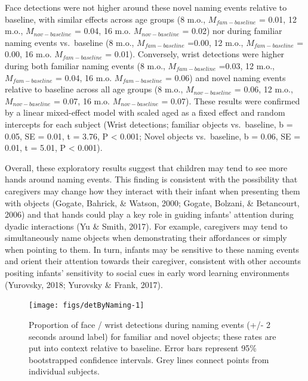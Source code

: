 \documentclass[english,man]{apa6}
\begin{document}
Face detections were not higher around these novel naming events
relative to baseline, with similar effects across age groups (8 m.o.,
\(M_{fam - baseline}\) = 0.01, 12 m.o., \(M_{nov - baseline}\) = 0.04,
16 m.o. \(M_{nov - baseline}\) = 0.02) nor during familiar naming events
vs.~baseline (8 m.o., \(M_{fam - baseline}\) =0.00, 12 m.o.,
\(M_{fam - baseline}\) = 0.00, 16 m.o. \(M_{fam - baseline}\) = 0.01).
Conversely, wrist detections were higher during both familiar naming
events (8 m.o., \(M_{fam - baseline}\) =0.03, 12 m.o.,
\(M_{fam - baseline}\) = 0.04, 16 m.o. \(M_{fam - baseline}\) = 0.06)
and novel naming events relative to baseline across all age groups (8
m.o., \(M_{nov - baseline}\) = 0.06, 12 m.o., \(M_{nov - baseline}\) =
0.07, 16 m.o. \(M_{nov - baseline}\) = 0.07). These results were
confirmed by a linear mixed-effect model with scaled aged as a fixed
effect and random intercepts for each subject (Wrist detections;
familiar objects vs.~baseline, b = 0.05, SE = 0.01, t = 3.76, P
\textless{} 0.001; Novel objects vs.~baseline, b = 0.06, SE = 0.01, t =
5.01, P \textless{} 0.001).

Overall, these exploratory results suggest that children may tend to see
more hands around naming events. This finding is consistent with the
possibility that caregivers may change how they interact with their
infant when presenting them with objects (Gogate, Bahrick, \& Watson,
2000; Gogate, Bolzani, \& Betancourt, 2006) and that hands could play a
key role in guiding infants' attention during dyadic interactions (Yu \&
Smith, 2017). For example, caregivers may tend to simultaneously name
objects when demonstrating their affordances or simply when pointing to
them. In turn, infants may be sensitive to these naming events and
orient their attention towards their caregiver, consistent with other
accounts positing infants' sensitivity to social cues in early word
learning environments (Yurovsky, 2018; Yurovsky \& Frank, 2017).

\begin{figure}[H]

{\centering \texttt{[image: figs/detByNaming-1]} 

}

\caption{Proportion of face / wrist detections during naming events (+/- 2 seconds around label) for familiar and novel objects; these rates are put into context relative to baseline. Error bars represent 95\% bootstrapped confidence intervals. Grey lines connect points from individual subjects.}\label{fig:detByNaming}
\end{figure}
\end{document}
